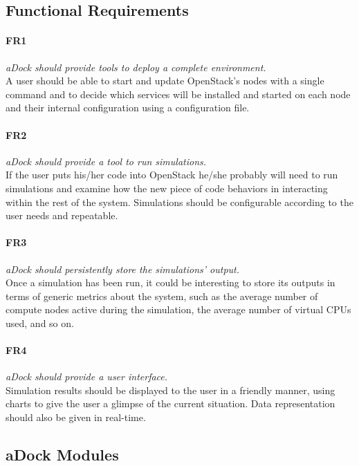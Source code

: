 \subsection{Functional Requirements}
\label{sub:func_req}

\paragraph{FR1}\label{p:fr1} \emph{aDock should provide tools to deploy a complete environment.} \hfill \\
A user should be able to start and update OpenStack's nodes with a single command and to decide which services will be installed and started on each node and their internal configuration using a configuration file.

\paragraph{FR2}\label{p:fr2} \emph{aDock should provide a tool to run simulations.} \hfill \\
If the user puts his/her code into OpenStack he/she probably will need to run simulations and examine how the new piece of code behaviors in interacting within the rest of the system. Simulations should be configurable according to the user needs and repeatable.

\paragraph{FR3}\label{p:fr3} \emph{aDock should persistently store the simulations' output.} \hfill \\
Once a simulation has been run, it could be interesting to store its outputs in terms of generic metrics about the system, such as the average number of compute nodes active during the simulation, the average number of virtual CPUs used, and so on.

\paragraph{FR4}\label{p:fr4} \emph{aDock should provide a user interface.} \hfill \\
Simulation results should be displayed to the user in a friendly manner, using charts to give the user a glimpse of the current situation. Data representation should also be given in real-time.

\subsection{aDock Modules}
\label{sub:adock_modules}

